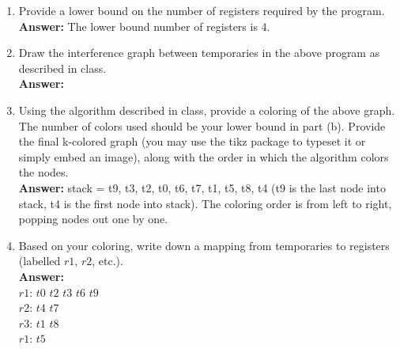 \documentclass[11pt]{article}
\begin{document}
\begin{enumerate}
\begin{enumerate}
   \newpage
    \item Provide a lower bound on the number of registers required by the program.\\
    \textbf{Answer:} 
    The lower bound number of registers is 4. 
    
   \newpage
    \item Draw the interference graph between temporaries in the above program as described in class.\\
    \textbf{Answer:} 
    
    
   \newpage
    \item Using the algorithm described in class, provide a coloring of the above graph. The number of colors used should be your lower bound in part (b). Provide the final k-colored graph (you may use the tikz package to typeset it or simply embed an image), along with the order in which the algorithm colors the nodes.\\
    \textbf{Answer:} 
    stack = {t9, t3, t2, t0, t6, t7, t1, t5, t8, t4} (t9 is the last node into stack, t4 is the first node into stack). 
	The coloring order is from left to right, popping nodes out one by one. 
    
   \newpage
    \item Based on your coloring, write down a mapping from temporaries to registers (labelled $r1$, $r2$, etc.).\\
    \textbf{Answer:} \\
    {$r1$: $t0$ $t2$ $t3$ $t6$ $t9$}\\
	{$r2$: $t4$ $t7$}\\
	{$r3$: $t1$ $t8$}\\
	{$r1$: $t5$}\\
    
   \newpage
  \end{enumerate}
  
\end{enumerate}
\end{document}
